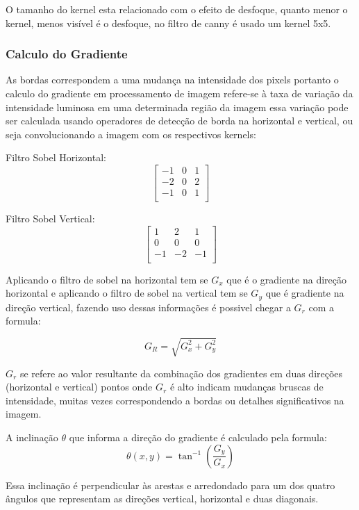 O tamanho do kernel esta relacionado com o efeito de desfoque, quanto menor o kernel, menos visível é o desfoque, no filtro de canny é usado um kernel 5x5.





\subsubsection[Calculo do Gradiente]{Calculo do Gradiente}

As bordas correspondem a uma mudança na intensidade dos pixels portanto o calculo do gradiente em processamento de imagem refere-se à taxa de variação da intensidade luminosa em uma determinada região da imagem essa variação pode ser calculada usando operadores de detecção de borda na horizontal e vertical, ou seja convolucionando a imagem com os respectivos kernels:

Filtro Sobel Horizontal:
\[
    \begin{bmatrix}
        -1 & 0 & 1 \\
        -2 & 0 & 2 \\
        -1 & 0 & 1 \\
    \end{bmatrix}
\]

Filtro Sobel Vertical:
\[
    \begin{bmatrix}
        1 & 2 & 1 \\
        0 & 0 & 0 \\
        -1 & -2 & -1 \\
    \end{bmatrix}
\]


Aplicando o filtro de sobel na horizontal tem se $G_x$ que é o gradiente na direção horizontal e aplicando o filtro de sobel na vertical tem se $G_y$ que é gradiente na direção vertical, fazendo uso dessas informações é possivel chegar a  $G_r$ com a formula:

$$G_R = \sqrt{G_x^2 + G_y^2}$$

$G_r$ se refere ao valor resultante da combinação dos gradientes em duas direções (horizontal e vertical) pontos onde $G_r$ é alto indicam mudanças bruscas de intensidade, muitas vezes correspondendo a bordas ou detalhes significativos na imagem. 

A inclinação $\theta$ que informa a direção do gradiente é calculado pela formula:
$$\theta(x,y) = \tan^{-1}\left(\frac{G_y}{G_x}\right)$$

Essa inclinação é perpendicular às arestas e arredondado para um dos quatro ângulos que representam as direções vertical, horizontal e duas diagonais.



